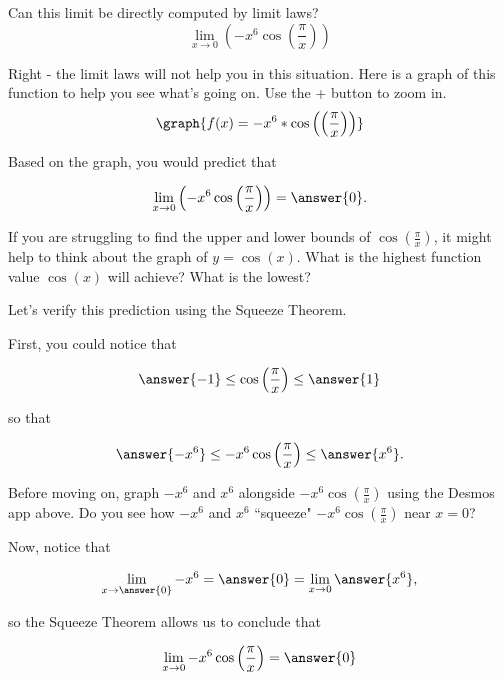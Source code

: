 \documentclass[handout]{ximera}
\begin{document}
\begin{exercise}
Can this limit be directly computed by limit laws?
  \[
  \displaystyle\lim_{x\to 0} \left(-x^6\cos\left(\frac{\pi}{x}\right)\right)
  \]
  
  \begin{multipleChoice}
  \end{multipleChoice}
  
\begin{exercise}
  
Right - the limit laws will not help you in this situation.  Here is a graph of this function to help you see what's going on.  Use the + button to zoom in.
  \[
   \graph{f(x)=-x^6*\cos\left(\left(\frac{\pi}{x}\right)\right)}
  \]
  
Based on the graph, you would predict that 

\[
  \displaystyle\lim_{x\to 0} \left(-x^6\cos\left(\frac{\pi}{x}\right)\right) = \answer{0}.
  \]
\begin{exercise}

\begin{hint}
If you are struggling to find the upper and lower bounds of  $\cos\left(\frac{\pi}{x}\right)$, it might help to think about the graph of $y = \cos(x)$.  What is the highest function value $\cos(x)$ will achieve?  What is the lowest? 
\end{hint}

Let's verify this prediction using the Squeeze Theorem.
 
First, you could notice that

\[ \answer{-1} \leq \cos\left(\frac{\pi}{x}\right) \leq \answer{1} \]

so that
   
\[ \answer{-x^6} \leq -x^6\cos\left(\frac{\pi}{x}\right) \leq \answer{x^6}. \]

\begin{exercise}

Before moving on, graph $-x^6$ and $x^6$ alongside $-x^6\cos\left(\frac{\pi}{x}\right)$ using the Desmos app above.  Do you see how $-x^6$ and $x^6$ ``squeeze" $-x^6\cos\left(\frac{\pi}{x}\right)$ near $x=0$?

Now, notice that 

\[ \displaystyle\lim_{x \to \answer{0}} -x^6 = \answer{0} = \displaystyle\lim_{x \to 0} \answer{x^6},\]

so the Squeeze Theorem allows us to conclude that 

\[ \displaystyle\lim_{x \to 0}  -x^6\cos\left(\frac{\pi}{x}\right) = \answer{0} \]

\end{exercise}

\end{exercise}
\end{exercise}
\end{exercise}
\end{document}
